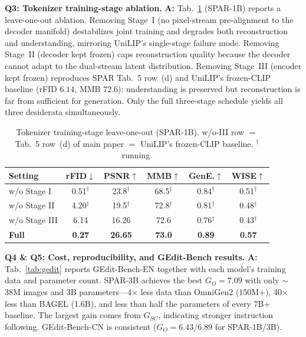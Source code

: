 \documentclass[10pt,twocolumn,letterpaper]{article}
\newcommand{\Rone}[1]{\textcolor{rOneColor}{#1}}
\newcommand{\Rtwo}[1]{\textcolor{rTwoColor}{#1}}
\newcommand{\Rthree}[1]{\textcolor{rThreeColor}{#1}}
\newcommand{\Qtext}[1]{\textcolor{questionColor}{#1}}
\begin{document}
\noindent[\textit{\Rtwo{F1M7}, \Rthree{umgx}}.] \textbf{\Qtext{Q3: Tokenizer training-stage ablation.}} \textbf{\Qtext{A:}} Tab.~\ref{tab:tokenizer} (SPAR-1B) reports a leave-one-out ablation. Removing Stage~I (no pixel-stream pre-alignment to the decoder manifold) destabilizes joint training and degrades both reconstruction and understanding, mirroring UniLIP's single-stage failure mode. Removing Stage~II (decoder kept frozen) caps reconstruction quality because the decoder cannot adapt to the dual-stream latent distribution. Removing Stage~III (encoder kept frozen) reproduces SPAR Tab.~5 row~(d) and UniLIP's frozen-CLIP baseline (rFID $6.14$, MMB $72.6$): understanding is preserved but reconstruction is far from sufficient for generation. Only the full three-stage schedule yields all three desiderata simultaneously.
\begin{table}[h]
\centering\footnotesize
\setlength{\tabcolsep}{2pt}
\begin{tabular}{lccccc}
\toprule
Setting & rFID$\downarrow$ & PSNR$\uparrow$ & MMB$\uparrow$ & GenE.$\uparrow$ & WISE$\uparrow$ \\
\midrule
w/o Stage I   & 0.51$^\dagger$ & 23.8$^\dagger$ & 68.5$^\dagger$ & 0.84$^\dagger$ & 0.51$^\dagger$ \\
w/o Stage II  & 4.20$^\dagger$ & 19.5$^\dagger$ & 72.8$^\dagger$ & 0.81$^\dagger$ & 0.48$^\dagger$ \\
w/o Stage III & 6.14 & 16.26 & 72.6 & 0.76$^\dagger$ & 0.43$^\dagger$ \\
\textbf{Full} & \textbf{0.27} & \textbf{26.65} & \textbf{73.0} & \textbf{0.89} & \textbf{0.57} \\
\bottomrule
\end{tabular}
\caption{Tokenizer training-stage leave-one-out (SPAR-1B). w/o-III row $=$ Tab.~5 row~(d) of main paper $=$ UniLIP's frozen-CLIP baseline. $^\dagger$running.}
\label{tab:tokenizer}
\end{table}

\noindent[\textit{\Rone{XtYZ}, \Rtwo{F1M7}, \Rthree{umgx}}.] \textbf{\Qtext{Q4 \& Q5: Cost, reproducibility, and GEdit-Bench results.}} \textbf{\Qtext{A:}} Tab.~\ref{tab:gedit} reports GEdit-Bench-EN together with each model's training data and parameter count. SPAR-3B achieves the best $G_{O}{=}7.09$ with only $\sim$38M images and 3B parameters---4$\times$ less data than OmniGen2 (150M+), 40$\times$ less than BAGEL (1.6B), and less than half the parameters of every 7B+ baseline. The largest gain comes from $G_{SC}$, indicating stronger instruction following. GEdit-Bench-CN is consistent ($G_{O}{=}6.43$/$6.89$ for SPAR-1B/3B).
\end{document}
